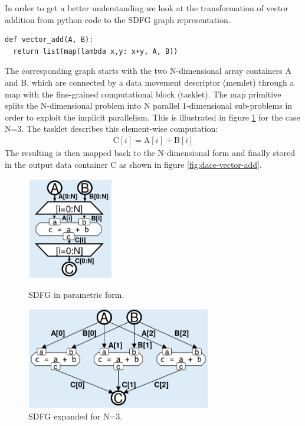 In order to get a better understanding we look at the transformation of vector addition from python code to the SDFG graph representation. 
\begin{verbatim}
def vector_add(A, B):
  return list(map(lambda x,y: x+y, A, B))
\end{verbatim}
The corresponding graph starts with the two N-dimensional array containers A and B, which are connected by a data movement descriptor (memlet) through a map with the fine-grained computational block (tasklet). The map primitive splits the N-dimensional problem into N parallel 1-dimensional sub-problems in order to exploit the implicit parallelism. This is illustrated in figure \ref{fig:dace-vetor-add-n3} for the case N=3. The tasklet describes this element-wise computation:
\begin{align}
\text{C}[i] = \text{A}[i] + \text{B}[i]
\end{align}
The resulting is then mapped back to the N-dimensional form and finally stored in the output data container C as shown in figure \ref{fig:dace-vector-add}.
\begin{figure}[H]
	\begin{minipage}{.5\columnwidth}
		\centering
		\includegraphics[height=12em]{images/dace-vector-add.png}
		\caption{SDFG in parametric form. \cite{label57}}
		\label{fig:dace-vector-add}
		\vspace{1.5em}
	\end{minipage}
	\begin{minipage}{.5\columnwidth}
		\centering
		\includegraphics[height=12em]{images/dace-vetor-add-n3.png}
		\caption{SDFG expanded for N=3. \cite{label57}}
		\label{fig:dace-vetor-add-n3}
	\end{minipage}
\end{figure}


